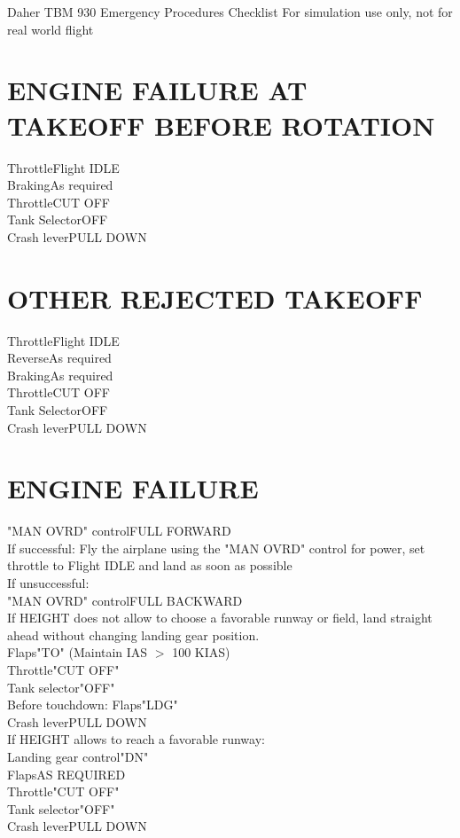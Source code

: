 \documentclass{article}
\begin{document}
\begin{center}
	{\fontsize{25}{70}\selectfont Daher TBM 930}
    \break
    {\fontsize{20.74}{70}\selectfont Emergency Procedures Checklist}
    \break
    \color{Red}
    {\fontsize{10}{70}\selectfont For simulation use only, not for real world flight}
\end{center}
\vspace{-2em}
\color{Black}
\begin{multicols*}{2}
\section*{ENGINE FAILURE AT TAKEOFF BEFORE ROTATION}
Throttle\dotfill Flight IDLE\\
Braking\dotfill As required\\
Throttle\dotfill CUT OFF\\
Tank Selector\dotfill OFF\\
Crash lever\dotfill PULL DOWN
\section*{OTHER REJECTED TAKEOFF}
Throttle\dotfill Flight IDLE\\
Reverse\dotfill As required\\
Braking\dotfill As required\\
Throttle\dotfill CUT OFF\\
Tank Selector\dotfill OFF\\
Crash lever\dotfill PULL DOWN
\section*{ENGINE FAILURE}
"MAN OVRD" control\dotfill FULL FORWARD\\
If successful: Fly the airplane using the "MAN OVRD" control for power, set throttle to Flight IDLE and land as soon as possible\\
If unsuccessful:\\
\hspace*{6mm}"MAN OVRD" control\dotfill FULL BACKWARD\\
If HEIGHT does not allow to choose a favorable runway or field, land straight ahead without changing landing gear position.\\
Flaps\dotfill "TO" (Maintain IAS $>$ 100 KIAS)\\
Throttle\dotfill "CUT OFF"\\
Tank selector\dotfill "OFF"\\
Before touchdown:
Flaps\dotfill "LDG"\\
Crash lever\dotfill PULL DOWN\\
If HEIGHT allows to reach a favorable runway:\\
Landing gear control\dotfill "DN"\\
Flaps\dotfill AS REQUIRED\\
Throttle\dotfill "CUT OFF"\\
Tank selector\dotfill "OFF"\\
Crash lever\dotfill PULL DOWN

\end{multicols*}
\end{document}
